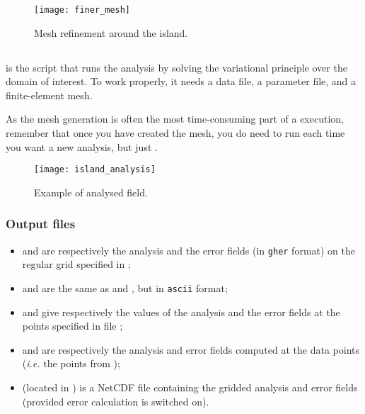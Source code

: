 \begin{figure}[htpb]
\centering
\texttt{[image: finer\_mesh]}
\caption{Mesh refinement around the island.\label{fig:square}}
\end{figure}



\subsection{\label{sec:divacalc}}

 is the script that runs the analysis by solving the variational principle over the domain of interest. To work properly, it needs a data file, a parameter file, and a finite-element mesh.

\btips
As the mesh generation is often the most time-consuming part of a \diva execution, remember that once you have created the mesh, you do need to run  each time you want a new analysis, but just .
\etips

\begin{figure}[H]
\centering
\parbox{.7\textwidth}{
\texttt{[image: island\_analysis]}
}\parbox{.3\textwidth}{
\caption{Example of analysed field.}
}
\end{figure}


\subsubsection{Output files}

\begin{itemize}
\item {} and  are respectively the analysis and the error fields (in \texttt{gher} format) on the regular grid specified in ;
\item {} and  are the same as  and , but in \texttt{ascii} format;
\item {} and  give respectively the values of the analysis and the error fields at the points specified in file ;
\item {} and  are respectively the analysis and error fields computed at the data points (\textit{i.e.} the points from );
\item {} (located in ) is a NetCDF file containing the gridded analysis and error fields (provided error calculation is switched on).
\end{itemize}


